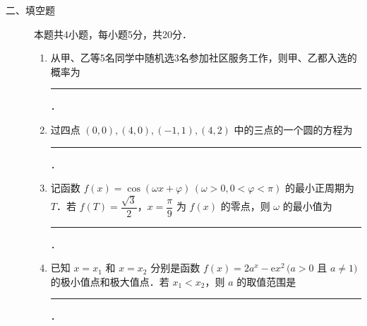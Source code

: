 \begin{description}
    \item[二、填空题] 本题共4小题，每小题5分，共20分．
    \begin{enumerate}[leftmargin=5pt]
      \addtocounter{enumi}{+12}
        \item 从甲、乙等5名同学中随机选3名参加社区服务工作，则甲、乙都入选的概率为 \rule[-0.3ex]{3em}{0.4pt}．
        \item 过四点 $(0,0),(4,0),(-1,1),(4,2)$ 中的三点的一个圆的方程为 \rule[-0.3ex]{3em}{0.4pt}．
        \item 记函数 $f(x)=\cos(\omega x+\varphi)\,(\omega>0,0<\varphi<\pi)$ 的最小正周期为 $T$．若 $f(T)=\dfrac{\sqrt{3}}{2}$，$x=\dfrac{\pi}{9}$ 为 $f(x)$ 的零点，则 $\omega$ 的最小值为 \rule[-0.3ex]{3em}{0.4pt}．
        \item 已知 $x=x_1$ 和 $x=x_2$ 分别是函数 $f(x)=2a^x-\mathrm{e} x^2\,(a>0$ 且 $a\neq1)$ 的极小值点和极大值点．若 $x_1<x_2$，则 $a$ 的取值范围是 \rule[-0.3ex]{3em}{0.4pt}．
    \end{enumerate}
\end{description}

